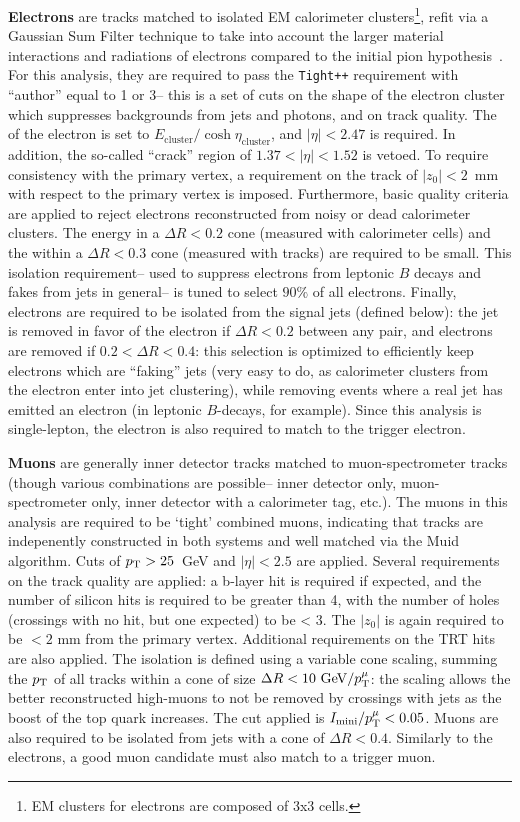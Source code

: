 	\textbf{Electrons} are tracks matched to isolated EM calorimeter clusters\footnote{EM clusters for electrons are composed of 3x3 cells.}, refit via a Gaussian Sum Filter technique to take into account the larger material interactions and radiations of electrons compared to the initial pion hypothesis~. For this analysis, they are required to pass the \texttt{Tight++} requirement with ``author'' equal to 1 or 3-- this is a set of cuts on the shape of the electron cluster which suppresses backgrounds from jets and photons, and on track quality. The \pt of the electron is set to $E_\mathrm{cluster} / \cosh \eta_\mathrm{cluster}$, and $|\eta| < 2.47$ is required. In addition, the so-called ``crack'' region of $1.37 < |\eta| < 1.52$ is vetoed. To require consistency with the primary vertex, a requirement on the track of $|z_0| < 2$~mm with respect to the primary vertex is imposed. Furthermore, basic quality criteria are applied to reject electrons reconstructed from noisy or dead calorimeter clusters. The energy in a $\Delta R < 0.2$ cone (measured with calorimeter cells) and the \pt within a $\Delta R < 0.3$ cone (measured with tracks) are required to be small. This isolation requirement-- used to suppress electrons from leptonic $B$ decays and fakes from jets in general-- is tuned to select $90\%$ of all electrons. Finally, electrons are required to be isolated from the signal jets (defined below): the jet is removed in favor of the electron if $\Delta R < 0.2$ between any pair, and electrons are removed if $0.2 < \Delta R < 0.4$: this selection is optimized to efficiently keep electrons which are ``faking'' jets (very easy to do, as calorimeter clusters from the electron enter into jet clustering), while removing events where a real jet has emitted an electron (in leptonic $B$-decays, for example). Since this analysis is single-lepton, the electron is also required to match to the trigger electron.

	\textbf{Muons} are generally inner detector tracks matched to muon-spectrometer tracks (though various combinations are possible-- inner detector only, muon-spectrometer only, inner detector with a calorimeter tag, etc.). The muons in this analysis are required to be `tight' combined muons, indicating that tracks are indepenently constructed in both systems and well matched via the Muid algorithm. Cuts of $p_{\text{T}} > 25$~GeV and $|\eta|<2.5$ are applied. Several requirements on the track quality are applied: a b-layer hit is required if expected, and the number of silicon hits is required to be greater than 4, with the number of holes (crossings with no hit, but one expected) to be < 3. The $|z_0|$ is again required to be $< 2$ mm from the primary vertex. Additional requirements on the TRT hits are also applied. The isolation is defined using a variable cone scaling, summing the $p_{\text{T}}$ of all tracks within a cone of size $\Delta R < 10~\mathrm{GeV} / p_{\text{T}}^{\mu}$: the scaling allows the better reconstructed high-\pt muons to not be removed by crossings with jets as the boost of the top quark increases. The cut applied is $I_\mathrm{mini} / p_{\text{T}}^{\mu} < 0.05 $.  Muons are also required to be isolated from jets with a cone of $\Delta R < 0.4$. Similarly to the electrons, a good muon candidate must also match to a trigger muon.

